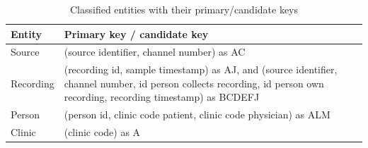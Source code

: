 \begin{table}
\begin{center}
\begin{tabular}{ |p{3cm}||p{10cm}|}
 \hline
 Entity& Primary key / candidate key\\
 \hline
 Source& (source identifier, channel number) as AC\\
 \hline
 Recording& (recording id, sample timestamp) as AJ, and (source identifier, channel number, id person collects recording, id person own recording, recording timestamp) as BCDEFJ\\
 \hline
 Person& (person id, clinic code patient, clinic code physician) as ALM\\
 \hline
 Clinic& (clinic code) as A\\
 \hline
\end{tabular}
\end{center}
\caption{Classified entities with their primary/candidate keys}
\label{tab:entitiesPrimaryKey}
\end{table}
